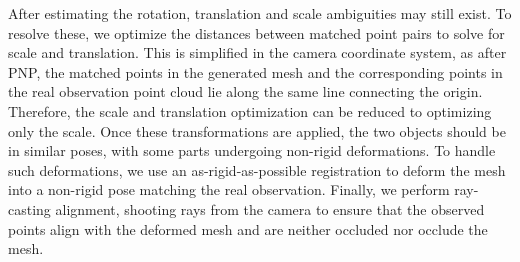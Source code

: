 \documentclass[10pt,twocolumn,letterpaper]{article}
\begin{document}
After estimating the rotation, translation and scale ambiguities may still exist. To resolve these, we optimize the distances between matched point pairs to solve for scale and translation. This is simplified in the camera coordinate system, as after PNP, the matched points in the generated mesh and the corresponding points in the real observation point cloud lie along the same line connecting the origin. Therefore, the scale and translation optimization can be reduced to optimizing only the scale. Once these transformations are applied, the two objects should be in similar poses, with some parts undergoing non-rigid deformations. To handle such deformations, we use an as-rigid-as-possible registration to deform the mesh into a non-rigid pose matching the real observation. Finally, we perform ray-casting alignment, shooting rays from the camera to ensure that the observed points align with the deformed mesh and are neither occluded nor occlude the mesh.










\end{document}
